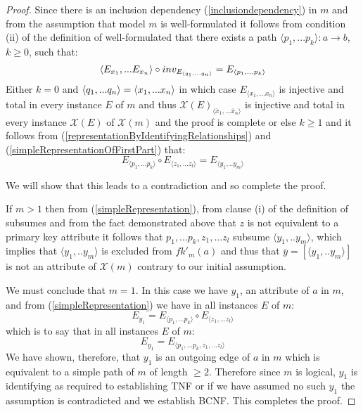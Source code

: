 \documentclass[10pt,a4paper]{article}
\newcommand{\genericmodel}{\mathcal{M}}
\renewcommand{\genericmodel}{{m}}
\newcommand{\fkp}[2] [\genericmodel]{fk'_{#1}(#2)}
\newcommand{\logtophys}{\mathcal{X}}
\newcommand{\phys}[1]{\overline{#1}}
\newcommand{\genericphysical}{\logtophys(\genericmodel)}
\newcommand{\ntuple}[1]{\tuple{#1_1,...#1_n}}
\newcommand {\qntuple}{\ensuremath{\ntuple{q}}}
\begin{document}
\begin{proof}
Since there is an inclusion dependency (\ref{inclusiondependency}) in $\genericmodel$ and from the assumption that  model
$\genericmodel$ is well-formulated it follows
 from condition (ii) of the definition of well-formulated  that there exists
a path $\langle p_1,...p_k \rangle:a \rightarrow b$, $k \geq 0$, such that:
\begin{equation}
\label{simpleRepresentationOfFirstPart}
\langle E_{x_1},...E_{x_n} \rangle \circ inv_{E_{\qntuple}} = E_{\langle p_1,...p_k \rangle}
\end{equation}
\noindent Either $k=0$ and $\qntuple = \langle x_1,...x_n \rangle$ in which case $E_{\langle x_1,...x_n \rangle}$ is
injective and total in every instance $E$ of $\genericmodel$ and thus $\logtophys(E)_{\langle \phys{x}_1,...\phys{x}_n \rangle}$ is
injective and total in every instance $\logtophys(E)$ of $\genericphysical$ and the proof is complete 
\noindent or else $k \geq 1$ and it follows from (\ref{representationByIdentifyingRelationships}) and (\ref{simpleRepresentationOfFirstPart}) that:
\begin{equation} 
\label{simpleRepresentation}
 E_{\langle p_1,...p_k \rangle} \circ E_{\langle z_1,...z_l \rangle} = E_{\langle y_1,..y_m \rangle} 
\end{equation}


We will show that this leads to a contradiction and so complete the proof. 

If $m >1$ then
 from  (\ref{simpleRepresentation}),
from clause (i) of the definition of subsumes and from the fact demonstrated above that $z$ is not equivalent to a 
primary key attribute
it follows that $p_1,...p_k,z_1,...z_l$ subsume $\langle y_1,..y_m \rangle$, 
which implies that $\langle y_1,..y_m \rangle$ is excluded from $\fkp{a}$ and thus that 
 $\phys{y}=\left[\langle y_1,..y_m \rangle\right]$ is not an attribute of $\genericphysical$ contrary to our 
initial assumption. 

We must conclude that $m=1$.
In this case we have $y_1$, an attribute of $a$ in $\genericmodel$, and from (\ref{simpleRepresentation})  we have in all instances $E$ of $\genericmodel$:
\begin{equation}
E_{y_1}=E_{\langle p_1,...p_k \rangle} \circ E_{\langle z_1,...z_l \rangle}
\end{equation}
\noindent which is to say that in all instances $E$ of $\genericmodel$:
\begin{equation}
E_{y_1}=E_{\langle p_1,...p_k ,z_1,...z_l \rangle}
\end{equation}
\noindent
We have shown, therefore, that $y_1$ is an outgoing edge of $a$ in $\genericmodel$ 
which is equivalent to a simple path of $\genericmodel$ of length $\geq 2$.
Therefore since $m$ is logical,  $y_1$ is identifying as required to establishing TNF
or if we have assumed no such $y_1$ the assumption is contradicted and we establish BCNF.
This completes the proof.
\end{proof}
\end{document}
